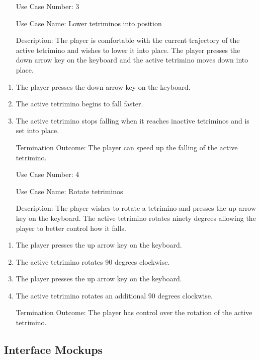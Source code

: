 \documentclass[10pt,conference,onecolumn,compsoc]{IEEEtran}
\begin{document}
\begin{itemize}
\item[Use Case Number:] 3
\item[Use Case Name:] Lower tetriminos into position
\item[Description:] The player is comfortable with the current trajectory of the active tetrimino and wishes to lower it into place. The player presses the down arrow key on the keyboard and the active tetrimino moves down into place.
\end{itemize}
\begin{enumerate}
\item The player presses the down arrow key on the keyboard.
\item The active tetrimino begins to fall faster.
\item The active tetrimino stops falling when it reaches inactive tetriminos and is set into place.
\item[Termination Outcome:] The player can speed up the falling of the active tetrimino.
\end{enumerate}
\medskip
 
\begin{itemize}
\item[Use Case Number:] 4
\item[Use Case Name:] Rotate tetriminos
\item[Description:] The player wishes to rotate a tetrimino and presses the up arrow key on the keyboard. The active tetrimino rotates ninety degrees allowing the player to better control how it falls.
\end{itemize}
\begin{enumerate}
\item The player presses the up arrow key on the keyboard.
\item The active tetrimino rotates 90 degrees clockwise.
\item The player presses the up arrow key on the keyboard.
\item The active tetrimino rotates an additional 90 degrees clockwise.
\item[Termination Outcome:] The player has control over the rotation of the active tetrimino.
\end{enumerate}
\medskip

\subsection{Interface Mockups}
\end{document}
